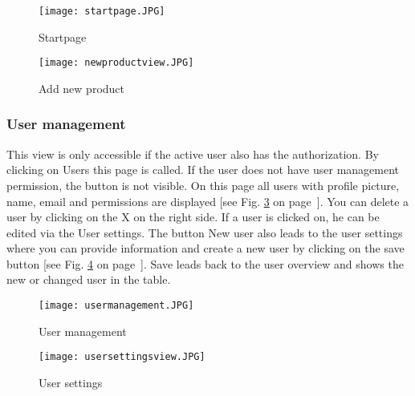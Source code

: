     \begin{figure}[h]
        \centering
        \texttt{[image: startpage.JPG]}
        \caption{Startpage}
        \label{fig: startpage}
    \end{figure}

    \begin{figure}[h]
        \centering
        \texttt{[image: newproductview.JPG]}
        \caption{Add new product}
        \label{fig: newproductview}
    \end{figure}

    \subsubsection*{User management}
    This view is only accessible if the active user also has the authorization. By clicking on Users this page is called. If the user does not have user management permission, the button is not visible. On this page all users with profile picture, name, email and permissions are displayed [see Fig. \ref{fig: usermanagement} on page~\pageref{fig: usermanagement}]. You can delete a user by clicking on the X on the right side. If a user is clicked on, he can be edited via the User settings. The button New user also leads to the user settings where you can provide information and create a new user by clicking on the save button [see Fig. \ref{fig: usersettingsview} on page~\pageref{fig: usersettingsview}]. Save leads back to the user overview and shows the new or changed user in the table.
    
    \begin{figure}[h]
        \centering
        \texttt{[image: usermanagement.JPG]}
        \caption{User management}
        \label{fig: usermanagement}
    \end{figure}

    \begin{figure}[h]
        \centering
        \texttt{[image: usersettingsview.JPG]}
        \caption{User settings}
        \label{fig: usersettingsview}
    \end{figure}


